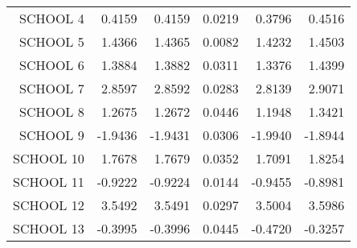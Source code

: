 \begin{table}[ht]
\begin{tabular}{rrrrrr}
  SCHOOL 4 & 0.4159 & 0.4159 & 0.0219 & 0.3796 & 0.4516 \\ 
  SCHOOL 5 & 1.4366 & 1.4365 & 0.0082 & 1.4232 & 1.4503 \\ 
  SCHOOL 6 & 1.3884 & 1.3882 & 0.0311 & 1.3376 & 1.4399 \\ 
  SCHOOL 7 & 2.8597 & 2.8592 & 0.0283 & 2.8139 & 2.9071 \\ 
  SCHOOL 8 & 1.2675 & 1.2672 & 0.0446 & 1.1948 & 1.3421 \\ 
  SCHOOL 9 & -1.9436 & -1.9431 & 0.0306 & -1.9940 & -1.8944 \\ 
  SCHOOL 10 & 1.7678 & 1.7679 & 0.0352 & 1.7091 & 1.8254 \\ 
  SCHOOL 11 & -0.9222 & -0.9224 & 0.0144 & -0.9455 & -0.8981 \\ 
  SCHOOL 12 & 3.5492 & 3.5491 & 0.0297 & 3.5004 & 3.5986 \\ 
  SCHOOL 13 & -0.3995 & -0.3996 & 0.0445 & -0.4720 & -0.3257 \\ 
   \hline
\end{tabular}
\end{table}


